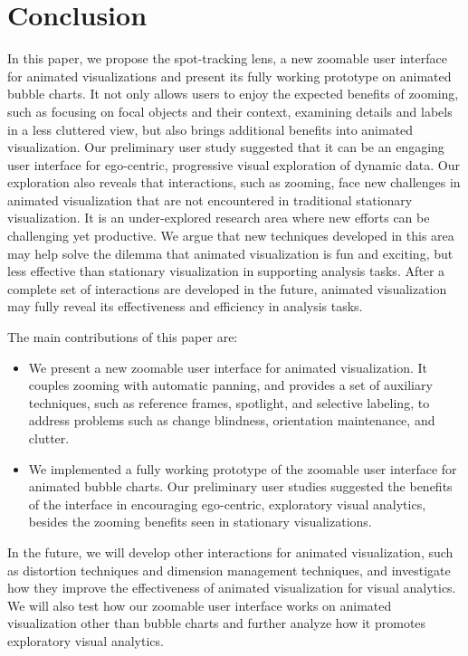 \documentclass[review]{vgtc}                 %
\begin{document}
\section{Conclusion}
\label{sec:conclusion}

In this paper, we propose the spot-tracking lens, a new zoomable user interface for animated visualizations and present its fully working prototype on animated bubble charts. It not only allows users to enjoy the expected benefits of zooming, such as focusing on focal objects and their context, examining details and labels in a less cluttered view, but also brings additional benefits into animated visualization. Our preliminary user study suggested that it can be an engaging user interface for ego-centric, progressive visual exploration of dynamic data. Our exploration also reveals that interactions, such as zooming, face new challenges in animated visualization that are not encountered in traditional stationary visualization. It is an under-explored research area where new efforts can be challenging yet productive. We argue that new techniques developed in this area may help solve the dilemma that animated visualization is fun and exciting, but less effective than stationary visualization in supporting analysis tasks. After a complete set of interactions are developed in the future, animated visualization may fully reveal its effectiveness and efficiency in analysis tasks.

The main contributions of this paper are:

\begin{itemize}
\item We present a new zoomable user interface for animated visualization. It couples zooming with automatic panning, and provides a set of auxiliary techniques, such as reference frames, spotlight, and selective labeling, to address problems such as change blindness, orientation maintenance, and clutter.
\item We implemented a fully working prototype of the zoomable user interface for animated bubble charts. Our preliminary user studies suggested the benefits of the interface in encouraging ego-centric, exploratory visual analytics, besides the zooming benefits seen in stationary visualizations.
\end{itemize}

In the future, we will develop other interactions for animated visualization, such as distortion techniques and dimension management techniques, and investigate how they improve the effectiveness of animated visualization for visual analytics. We will also test how our zoomable user interface works on animated visualization other than bubble charts and further analyze how it promotes exploratory visual analytics.




\end{document}
